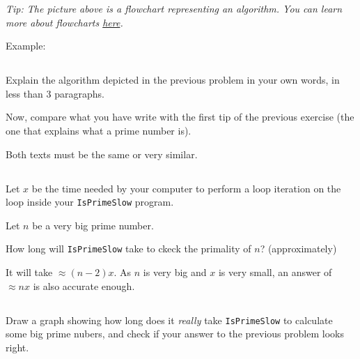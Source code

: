 \documentclass[a4paper, 12pt]{article}
\begin{document}
\textsl{Tip: The picture above is a flowchart representing an algorithm. You
can learn more about flowcharts
\href{http://en.wikipedia.org/wiki/Flowchart}{here}.}

Example:



\subsection{}

Explain the algorithm depicted in the previous problem in your own words, in
less than 3 paragraphs.

Now, compare what you have write with the first tip of the previous exercise
(the one that explains what a prime number is).

\begin{solution}
Both texts must be the same or very similar.
\end{solution}

\subsection{}

Let $x$ be the time needed by your computer to perform a loop iteration on the
loop inside your \texttt{IsPrimeSlow} program.

Let $n$ be a very big prime number.

How long will \texttt{IsPrimeSlow} take to ckeck the primality of $n$?
(approximately)

\begin{solution}
It will take $\approx(n-2)x$.
As $n$ is very big and $x$ is very small, an answer of $\approx nx$ is also
accurate enough.
\end{solution}

\subsection{}

Draw a graph showing how long does it \emph{really} take \texttt{IsPrimeSlow}
to calculate some big prime nubers, and check if your answer to the previous
problem looks right.
\end{document}
